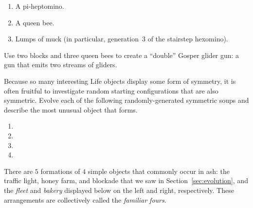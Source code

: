 \begin{multicols}{2}
\begin{problemstar}
\begin{enumerate}[label=\bf\color{ocre}(\alph*)]
	\item A pi-heptomino.
	
	\item A queen bee.
	
	\item Lumps of muck (in particular, generation~$3$ of the stairstep hexomino).
\end{enumerate}
\end{problemstar}


\mfilbreak


\begin{problem}\label{exer:double_gosper_gun}
Use two blocks and three queen bees to create a ``double'' Gosper glider gun: a gun that emits two streams of gliders.
\end{problem}


\mfilbreak


\begin{problemstar}\label{exer:random_symmetric}
	Because so many interesting Life objects display some form of symmetry, it is often fruitful to investigate random starting configurations that are also symmetric. Evolve each of the following randomly-generated symmetric soups and describe the most unusual object that forms.\smallskip
	
	\begin{enumerate}[label=\bf\color{ocre}(\alph*)]
		\item {}
			
		\item {}
		
		\item {}
			
		\item {}
	\end{enumerate}
\end{problemstar}


\mfilbreak


\begin{problemstar}\label{exer:familiar_fours}
There are $5$ formations of $4$ simple objects that commonly occur in ash: the traffic light, honey farm, and blockade that we saw in Section~\ref{sec:evolution}, and the \emph{fleet} and \emph{bakery} displayed below on the left and right, respectively. These arrangements are collectively called the \emph{familiar fours}.


\end{problemstar}
\end{multicols}
